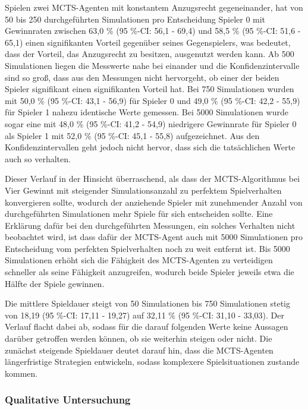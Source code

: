 Spielen zwei MCTS-Agenten mit konstantem Anzugsrecht gegeneinander, hat von 50 bis 250 durchgeführten Simulationen pro Entscheidung Spieler 0 mit Gewinnraten zwischen 63,0 \% (95 \%-CI: 56,1 - 69,4) und 58,5 \% (95 \%-CI: 51,6 - 65,1) einen signifikanten Vorteil gegenüber seines Gegenspielers, was bedeutet, dass der Vorteil, das Anzugsrecht zu besitzen, ausgenutzt werden kann. Ab 500 Simulationen liegen die Messwerte nahe bei einander und die Konfidenzintervalle sind so groß, dass aus den Messungen nicht hervorgeht, ob einer der beiden Spieler signifikant einen signifikanten Vorteil hat. Bei 750 Simulationen wurden mit 50,0 \% (95 \%-CI: 43,1 - 56,9) für Spieler 0 und 49,0 \% (95 \%-CI: 42,2 - 55,9) für Spieler 1 nahezu identische Werte gemessen. Bei 5000 Simulationen wurde sogar eine mit 48,0 \% (95 \%-CI: 41,2 - 54,9) niedrigere Gewinnrate für Spieler 0 als Spieler 1 mit 52,0 \% (95 \%-CI: 45,1 - 55,8) aufgezeichnet. Aus den Konfidenzintervallen geht jedoch nicht hervor, dass sich die tatsächlichen Werte auch so verhalten.

Dieser Verlauf in der Hinsicht überraschend, als dass der MCTS-Algorithmus bei Vier Gewinnt mit steigender Simulationsanzahl zu perfektem Spielverhalten konvergieren sollte, wodurch der anziehende Spieler mit zunehmender Anzahl von durchgeführten Simulationen mehr Spiele für sich entscheiden sollte. Eine Erklärung dafür bei den durchgeführten Messungen, ein solches Verhalten nicht beobachtet wird, ist dass dafür der MCTS-Agent auch mit 5000 Simulationen pro Entscheidung vom perfekten Spielverhalten noch zu weit entfernt ist. Bis 5000 Simulationen erhöht sich die Fähigkeit des MCTS-Agenten zu verteidigen schneller als seine Fähigkeit anzugreifen, wodurch beide Spieler jeweils etwa die Hälfte der Spiele gewinnen.

Die mittlere Spieldauer steigt von 50 Simulationen bis 750 Simulationen stetig von 18,19 (95 \%-CI: 17,11 - 19,27) auf 32,11 \% (95 \%-CI: 31,10 - 33,03). Der Verlauf flacht dabei ab, sodass für die darauf folgenden Werte keine Aussagen darüber getroffen werden können, ob sie weiterhin steigen oder nicht. Die zunächst steigende Spieldauer deutet darauf hin, dass die MCTS-Agenten längerfristige Strategien entwickeln, sodass komplexere Spielsituationen zustande kommen.

\subsubsection{Qualitative Untersuchung}

\label{qualitative-untersuchung}

